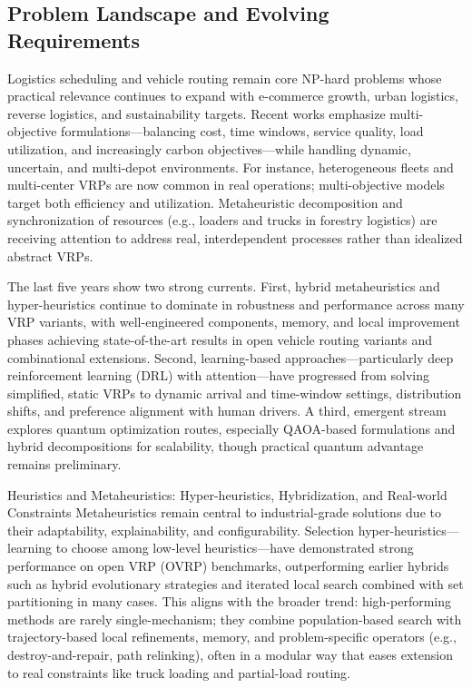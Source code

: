 \subsection{Problem Landscape and Evolving Requirements}
Logistics scheduling and vehicle routing remain core NP-hard problems whose practical relevance continues to expand with e-commerce growth, urban logistics, reverse logistics, and sustainability targets. Recent works emphasize multi-objective formulations—balancing cost, time windows, service quality, load utilization, and increasingly carbon objectives—while handling dynamic, uncertain, and multi-depot environments. For instance, heterogeneous fleets and multi-center VRPs are now common in real operations; multi-objective models target both efficiency and utilization. Metaheuristic decomposition and synchronization of resources (e.g., loaders and trucks in forestry logistics) are receiving attention to address real, interdependent processes rather than idealized abstract VRPs.​

The last five years show two strong currents. First, hybrid metaheuristics and hyper-heuristics continue to dominate in robustness and performance across many VRP variants, with well-engineered components, memory, and local improvement phases achieving state-of-the-art results in open vehicle routing variants and combinational extensions. Second, learning-based approaches—particularly deep reinforcement learning (DRL) with attention—have progressed from solving simplified, static VRPs to dynamic arrival and time-window settings, distribution shifts, and preference alignment with human drivers. A third, emergent stream explores quantum optimization routes, especially QAOA-based formulations and hybrid decompositions for scalability, though practical quantum advantage remains preliminary.​

Heuristics and Metaheuristics: Hyper-heuristics, Hybridization, and Real-world Constraints
Metaheuristics remain central to industrial-grade solutions due to their adaptability, explainability, and configurability. Selection hyper-heuristics—learning to choose among low-level heuristics—have demonstrated strong performance on open VRP (OVRP) benchmarks, outperforming earlier hybrids such as hybrid evolutionary strategies and iterated local search combined with set partitioning in many cases. This aligns with the broader trend: high-performing methods are rarely single-mechanism; they combine population-based search with trajectory-based local refinements, memory, and problem-specific operators (e.g., destroy-and-repair, path relinking), often in a modular way that eases extension to real constraints like truck loading and partial-load routing.​

